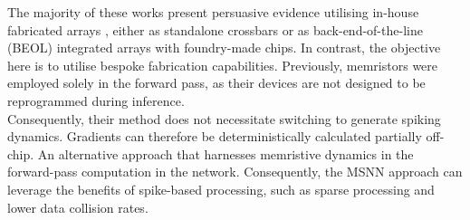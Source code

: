 
\noindent The majority of these works present persuasive evidence utilising in-house fabricated arrays \cite{molter2016generalized}, either as standalone crossbars or as back-end-of-the-line (BEOL) integrated arrays with foundry-made chips. In contrast, the objective here is to utilise bespoke fabrication capabilities. Previously, memristors were employed solely in the forward pass, as their devices are not designed to be reprogrammed during inference. \\

\noindent Consequently, their method does not necessitate switching to generate spiking dynamics. Gradients can therefore be deterministically calculated partially off-chip. An alternative approach that harnesses memristive dynamics in the forward-pass computation in the network. Consequently, the MSNN approach can leverage the benefits of spike-based processing, such as sparse processing and lower data collision rates.\\



